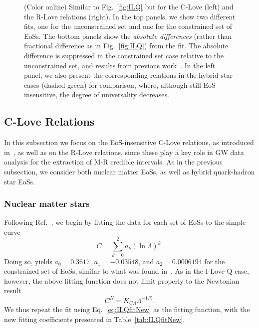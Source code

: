 \documentclass[prd,twocolumn,nofootinbib,superscriptaddress,amsmath,amssymb]{revtex4-1}
\begin{document}
\begin{figure}
\begin{center}
\end{center}
\caption{
(Color online) Similar to Fig.~\ref{fig:ILQ} but for the C-Love (left) and the R-Love relations (right). In the top panels, we show two different fits, one for the unconstrained set and one for the constrained set of EoSs. The bottom panels show the \emph{absolute differences} (rather than fractional difference as in Fig.~\ref{fig:ILQ}) from the fit. The absolute difference is suppressed in the constrained set case relative to the unconstrained set, and results from previous work~\cite{Maselli:2013mva}. In the left panel, we also present the corresponding relations in the hybrid star cases (dashed green) for comparison, where, although still EoS-insensitive, the degree of universality decreases.
}
\label{fig:clove}
\end{figure} 

\subsection{C-Love Relations}
\label{sec:clove}

In this subsection we focus on the EoS-insensitive C-Love relations, as introduced in~\cite{Yagi:2013bca,Yagi:ILQ,Maselli:2013mva}, as well as on the R-Love relations, since these play a key role in GW data analysis for the extraction of M-R credible intervals. As in the previous subsection, we consider both nuclear matter EoSs, as well as hybrid quark-hadron star EoSs.

\subsubsection{Nuclear matter stars}
\label{sec:clove-nuc}

Following Ref.~\cite{Maselli:2013mva}, we begin by fitting the data for each set of EoSs to the simple curve
\begin{equation}
C = \sum^2_{k=0} a_k (\ln{\Lambda})^k.
\end{equation}
Doing so, yields $a_0 = 0.3617$, $a_1 = -0.03548$, and $a_2 = 0.0006194$ for the constrained set of EoSs, similar to what was found in~\cite{Maselli:2013mva}. As in the I-Love-Q case, however, the above fitting function does not limit properly to the Newtonian result 
\begin{equation}
C^N=K_{C\Lambda}\Lambda^{-1/5}.\label{eq:cloveFit}
\end{equation}
We thus repeat the fit using Eq.~\eqref{eq:ILQfitNew} as the fitting function, with the new fitting coefficients presented in Table~\ref{tab:ILQfitNew}.
\end{document}
